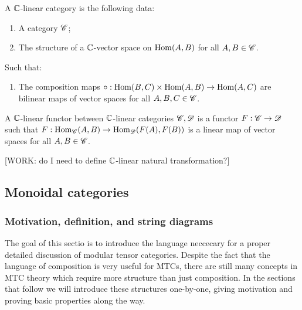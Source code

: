 \begin{definition} A $\mathbb{C}$-linear category is the following data:

\begin{enumerate}
\item A category $\mathscr{C}$;
\item The structure of a $\mathbb{C}$-vector space on $\operatorname{Hom}(A,B)$ for all $A,B\in \mathscr{C}$.

\end{enumerate}

Such that:

\begin{enumerate}

\item The composition maps $\circ:\operatorname{Hom}(B,C)\times \operatorname{Hom}(A,B)\to \operatorname{Hom}(A,C)$ are bilinear maps of vector spaces for all $A,B,C\in \mathscr{C}$.
\end{enumerate}

\raggedleft\qedsymbol{}
\end{definition}



\begin{definition} A $\mathbb{C}$-linear functor between $\mathbb{C}$-linear categories $\mathscr{C},\mathscr{D}$ is a functor $F:\mathscr{C}\to\mathscr{D}$ such that $F:\operatorname{Hom}_{\mathscr{C}}(A,B)\to\operatorname{Hom}_{\mathscr{D}}(F(A),F(B))$ is a linear map of vector spaces for all $A,B\in\mathscr{C}$.

\raggedleft\qedsymbol{}
\end{definition}


[WORK: do I need to define $\mathbb{C}$-linear natural transformation?]

\subsection{Monoidal categories}

\subsubsection{Motivation, definition, and string diagrams}

The goal of this sectio is to introduce the language neccecary for a proper detailed discussion of modular tensor categories. Despite the fact that the language of composition is very useful for MTCs, there are still many concepts in MTC theory which require more structure than just composition. In the sections that follow we will introduce these structures one-by-one, giving motivation and proving basic properties along the way.

